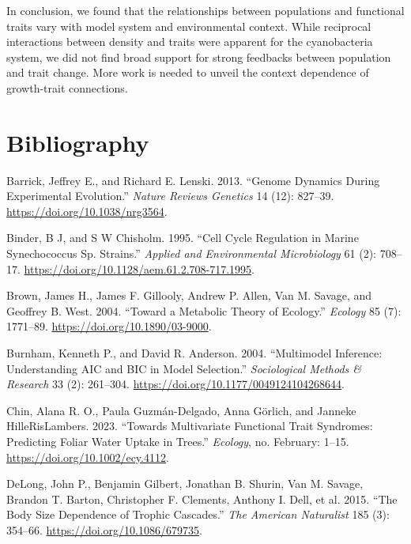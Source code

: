\documentclass[
  letterpaper,
  DIV=11,
  numbers=noendperiod]{scrartcl}
\newlength{\cslhangindent}
\newenvironment{CSLReferences}[2] %
 {\begin{list}{}{%
  \setlength{\itemindent}{0pt}
  \setlength{\leftmargin}{0pt}
  \setlength{\parsep}{0pt}
  \ifodd #1
   \setlength{\leftmargin}{\cslhangindent}
   \setlength{\itemindent}{-1\cslhangindent}
  \fi
  \setlength{\itemsep}{#2\baselineskip}}}
 {\end{list}}
\begin{document}
In conclusion, we found that the relationships between populations and
functional traits vary with model system and environmental context.
While reciprocal interactions between density and traits were apparent
for the cyanobacteria system, we did not find broad support for strong
feedbacks between population and trait change. More work is needed to
unveil the context dependence of growth-trait connections.

\section*{Bibliography}\label{bibliography}

\label{refs}
\begin{CSLReferences}{1}{0}
Barrick, Jeffrey E., and Richard E. Lenski. 2013. {``Genome Dynamics
During Experimental Evolution.''} \emph{Nature Reviews Genetics} 14
(12): 827--39. \url{https://doi.org/10.1038/nrg3564}.

Binder, B J, and S W Chisholm. 1995. {``Cell {Cycle Regulation} in
{Marine Synechococcus} Sp. {Strains}.''} \emph{Applied and Environmental
Microbiology} 61 (2): 708--17.
\url{https://doi.org/10.1128/aem.61.2.708-717.1995}.

Brown, James H., James F. Gillooly, Andrew P. Allen, Van M. Savage, and
Geoffrey B. West. 2004. {``Toward a {Metabolic Theory} of {Ecology}.''}
\emph{Ecology} 85 (7): 1771--89. \url{https://doi.org/10.1890/03-9000}.

Burnham, Kenneth P., and David R. Anderson. 2004. {``Multimodel
{Inference}: {Understanding AIC} and {BIC} in {Model Selection}.''}
\emph{Sociological Methods \& Research} 33 (2): 261--304.
\url{https://doi.org/10.1177/0049124104268644}.

Chin, Alana R. O., Paula Guzmán-Delgado, Anna Görlich, and Janneke
HilleRisLambers. 2023. {``Towards Multivariate Functional Trait
Syndromes: {Predicting} Foliar Water Uptake in Trees.''} \emph{Ecology},
no. February: 1--15. \url{https://doi.org/10.1002/ecy.4112}.

DeLong, John P., Benjamin Gilbert, Jonathan B. Shurin, Van M. Savage,
Brandon T. Barton, Christopher F. Clements, Anthony I. Dell, et al.
2015. {``The {Body Size Dependence} of {Trophic Cascades}.''} \emph{The
American Naturalist} 185 (3): 354--66.
\url{https://doi.org/10.1086/679735}.


\end{CSLReferences}
\end{document}
